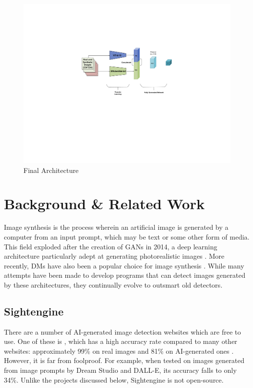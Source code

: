 \documentclass{article} %
\begin{document}
\begin{figure}[h]
    \begin{center}
        \includegraphics[scale=0.45]{figs/EffiVit.pdf}
    \end{center}
    \caption{Final Architecture}
    \label{fig:EffVit Architecture}
\end{figure}

\section{Background \& Related Work}
\label{background}

Image synthesis is the process wherein an artificial image is generated by a computer from an input prompt, which may be text or some other form of media. This field exploded after the creation of GANs in 2014, a deep learning architecture particularly adept at generating photorealistic images \citep{GANfather}. More recently, DMs have also been a popular choice for image synthesis \citep{latent-diffusion}. While many attempts have been made to develop programs that can detect images generated by these architectures, they continually evolve to outsmart old detectors.

\subsection{Sightengine}

There are a number of AI-generated image detection websites which are free to use. One of these is \citet{sightengine}, which has a high accuracy rate compared to many other websites: approximately 99\% on real images and 81\% on AI-generated ones \citep{li2024adversarialaiartunderstandinggeneration}. However, it is far from foolproof. For example, when tested on images generated from image prompts by Dream Studio and DALL-E, its accuracy falls to only 34\%. Unlike the projects discussed below, Sightengine is not open-source.
\end{document}
